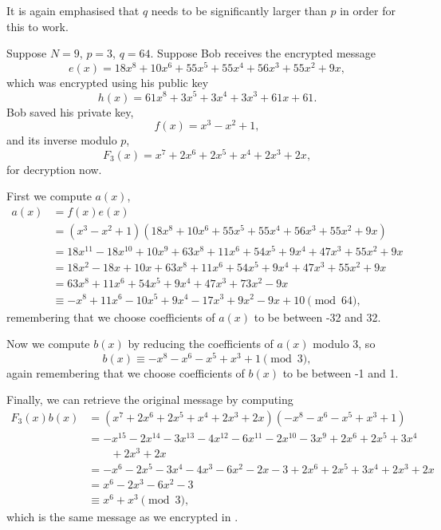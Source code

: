 It is again emphasised that $q$ needs to be significantly larger than $p$ in order for this to work.

\begin{example}
    Suppose $N = 9$, $p = 3$, $q = 64$. Suppose Bob receives the encrypted message
    \[
        e(x) = 18x^8 + 10x^6 + 55x^5 + 55x^4 + 56x^3 + 55x^2 + 9x,
    \]
    which was encrypted using his public key
    \[
        h(x) = 61x^8 + 3x^5 + 3x^4 + 3x^3 + 61x + 61.
    \]
    Bob saved his private key,
    \[
        f(x) = x^3 - x^2 + 1,
    \]
    and its inverse modulo $p$,
    \[
        F_3(x) = x^7 + 2x^6 + 2x^5 +x^4 + 2x^3 + 2x,
    \]
    for decryption now.

    First we compute $a(x)$,
    \begin{align*}
        a(x) &= f(x)e(x)\\
        &= (x^3 - x^2 + 1)(18x^8 + 10x^6 + 55x^5 + 55x^4 + 56x^3 + 55x^2 + 9x)\\
        &= 18x^11 - 18x^10 + 10x^9 + 63x^8 + 11x^6 + 54x^5 + 9x^4 + 47x^3 + 55x^2 + 9x\\
        &= 18x^2 - 18x + 10x + 63x^8 + 11x^6 + 54x^5 + 9x^4 + 47x^3 + 55x^2 + 9x\\
        &= 63x^8 + 11x^6 + 54x^5 + 9x^4 + 47x^3 + 73x^2 - 9x\\
        &\equiv -x^8 + 11x^6 - 10x^5 + 9x^4 - 17x^3 + 9x^2 - 9x + 10 \pmod{64},
    \end{align*}
    remembering that we choose coefficients of $a(x)$ to be between -32 and 32.

    Now we compute $b(x)$ by reducing the coefficients of $a(x)$ modulo 3, so
    \[
        b(x) \equiv -x^8 - x^6 - x^5 + x^3 + 1 \pmod{3},
    \]
    again remembering that we choose coefficients of $b(x)$ to be between -1 and 1.

    Finally, we can retrieve the original message by computing
    \begin{align*}
        F_3(x)b(x) &= (x^7 + 2x^6 + 2x^5 +x^4 + 2x^3 + 2x)(-x^8 - x^6 - x^5 + x^3 + 1)\\
        &= -x^{15} - 2x^{14} - 3x^{13} - 4x^{12} - 6x^{11} - 2x^{10} - 3x^9 + 2x^6 + 2x^5 + 3x^4\\
        &\quad\quad + 2x^3 + 2x\\
        &= -x^6 - 2x^5 - 3x^4 - 4x^3 - 6x^2 - 2x - 3 + 2x^6 + 2x^5 + 3x^4 + 2x^3 + 2x\\
        &= x^6 - 2x^3 - 6x^2 - 3\\
        &\equiv x^6 + x^3 \pmod{3},
    \end{align*}
    which is the same message as we encrypted in .
\end{example}

